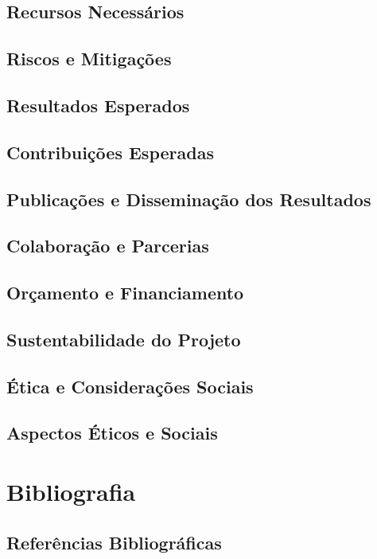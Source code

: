 \documentclass{SBCbookchapter}
\begin{document}
\subsection{Recursos Necessários}
\subsection{Riscos e Mitigações}
\subsection{Resultados Esperados}
\subsection{Contribuições Esperadas}
\subsection{Publicações e Disseminação dos Resultados}
\subsection{Colaboração e Parcerias}
\subsection{Orçamento e Financiamento}
\subsection{Sustentabilidade do Projeto}
\subsection{Ética e Considerações Sociais}
\subsection{Aspectos Éticos e Sociais}


\section{Bibliografia}
\subsection{Referências Bibliográficas}
\end{document}
